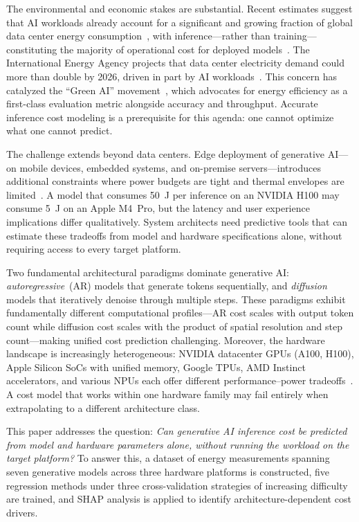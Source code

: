 \documentclass[review,12pt,authoryear]{elsarticle}
\begin{document}
The environmental and economic stakes are substantial.
Recent estimates suggest that AI workloads already account for a significant and growing fraction of global data center energy consumption~\citep{patterson2021carbon,wu2022sustainable}, with inference---rather than training---constituting the majority of operational cost for deployed models~\citep{desislavov2023trends}.
The International Energy Agency projects that data center electricity demand could more than double by 2026, driven in part by AI workloads~\citep{iea2024electricity}.
This concern has catalyzed the ``Green AI'' movement~\citep{schwartz2020green}, which advocates for energy efficiency as a first-class evaluation metric alongside accuracy and throughput.
Accurate inference cost modeling is a prerequisite for this agenda: one cannot optimize what one cannot predict.

The challenge extends beyond data centers.
Edge deployment of generative AI---on mobile devices, embedded systems, and on-premise servers---introduces additional constraints where power budgets are tight and thermal envelopes are limited~\citep{xu2024survey_edge}.
A model that consumes \SI{50}{\joule} per inference on an NVIDIA H100 may consume \SI{5}{\joule} on an Apple M4~Pro, but the latency and user experience implications differ qualitatively.
System architects need predictive tools that can estimate these tradeoffs from model and hardware specifications alone, without requiring access to every target platform.

Two fundamental architectural paradigms dominate generative AI: \emph{autoregressive}~(AR) models that generate tokens sequentially, and \emph{diffusion} models that iteratively denoise through multiple steps.
These paradigms exhibit fundamentally different computational profiles---AR cost scales with output token count while diffusion cost scales with the product of spatial resolution and step count---making unified cost prediction challenging.
Moreover, the hardware landscape is increasingly heterogeneous: NVIDIA datacenter GPUs (A100, H100), Apple Silicon SoCs with unified memory, Google TPUs, AMD Instinct accelerators, and various NPUs each offer different performance--power tradeoffs~\citep{jouppi2017datacenter}.
A cost model that works within one hardware family may fail entirely when extrapolating to a different architecture class.

This paper addresses the question: \emph{Can generative AI inference cost be predicted from model and hardware parameters alone, without running the workload on the target platform?}
To answer this, a dataset of \unskip{} energy measurements spanning seven generative models across three hardware platforms is constructed, five regression methods under three cross-validation strategies of increasing difficulty are trained, and SHAP analysis is applied to identify architecture-dependent cost drivers.
\end{document}
